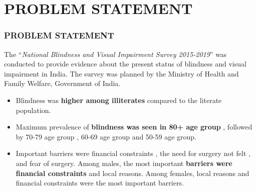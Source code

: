 \documentclass[
	11pt, %
	t, %
	aspectratio=169, %
]{beamer}
\begin{document}
\section{PROBLEM STATEMENT}
\begin{frame}
	\frametitle{PROBLEM STATEMENT}

\begin{block}{} %
		The “\textit{National Blindness and Visual Impairment Survey 2015-2019}” was conducted to provide evidence about the present status of blindness and visual impairment in India. The survey was planned by the Ministry of Health and Family Welfare, Government of India.
	\end{block}

\begin{itemize}
		\item Blindness was \textbf{higher among illiterates} compared to the literate population.
\item Maximum prevalence of \textbf{blindness was seen in 80+ age group} , followed by 70-79 age group , 60-69 age group and 50-59 age group.
\item Important barriers were financial constraints , the need for surgery not felt , and fear of surgery. Among males, the most important \textbf{barriers were financial constraints} and local reasons. Among females, local reasons and financial constraints were the most important barriers.
	    \end{itemize}

\end{frame}
\end{document}
